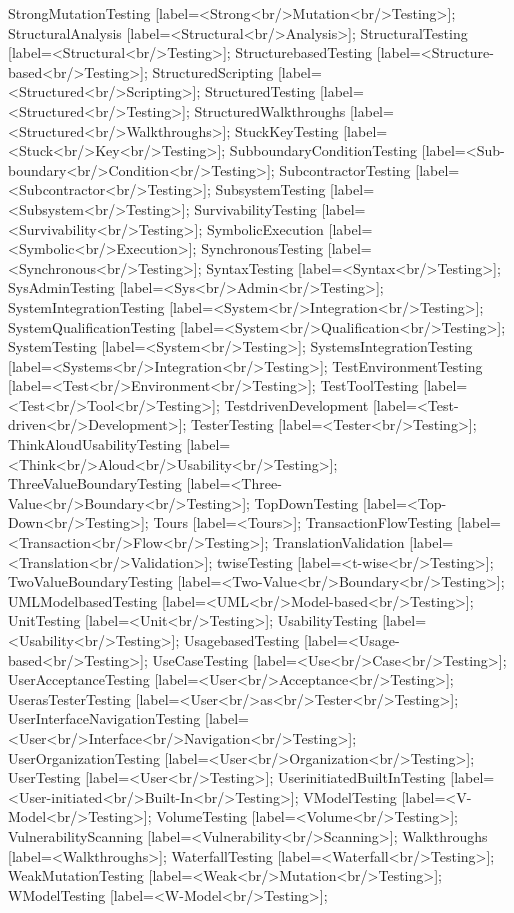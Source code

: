 \documentclass{article}
\begin{document}
{StrongMutationTesting [label=<Strong<br/>Mutation<br/>Testing>];
StructuralAnalysis [label=<Structural<br/>Analysis>];
StructuralTesting [label=<Structural<br/>Testing>];
StructurebasedTesting [label=<Structure-based<br/>Testing>];
StructuredScripting [label=<Structured<br/>Scripting>];
StructuredTesting [label=<Structured<br/>Testing>];
StructuredWalkthroughs [label=<Structured<br/>Walkthroughs>];
StuckKeyTesting [label=<Stuck<br/>Key<br/>Testing>];
SubboundaryConditionTesting [label=<Sub-boundary<br/>Condition<br/>Testing>];
SubcontractorTesting [label=<Subcontractor<br/>Testing>];
SubsystemTesting [label=<Subsystem<br/>Testing>];
SurvivabilityTesting [label=<Survivability<br/>Testing>];
SymbolicExecution [label=<Symbolic<br/>Execution>];
SynchronousTesting [label=<Synchronous<br/>Testing>];
SyntaxTesting [label=<Syntax<br/>Testing>];
SysAdminTesting [label=<Sys<br/>Admin<br/>Testing>];
SystemIntegrationTesting [label=<System<br/>Integration<br/>Testing>];
SystemQualificationTesting [label=<System<br/>Qualification<br/>Testing>];
SystemTesting [label=<System<br/>Testing>];
SystemsIntegrationTesting [label=<Systems<br/>Integration<br/>Testing>];
TestEnvironmentTesting [label=<Test<br/>Environment<br/>Testing>];
TestToolTesting [label=<Test<br/>Tool<br/>Testing>];
TestdrivenDevelopment [label=<Test-driven<br/>Development>];
TesterTesting [label=<Tester<br/>Testing>];
ThinkAloudUsabilityTesting [label=<Think<br/>Aloud<br/>Usability<br/>Testing>];
ThreeValueBoundaryTesting [label=<Three-Value<br/>Boundary<br/>Testing>];
TopDownTesting [label=<Top-Down<br/>Testing>];
Tours [label=<Tours>];
TransactionFlowTesting [label=<Transaction<br/>Flow<br/>Testing>];
TranslationValidation [label=<Translation<br/>Validation>];
twiseTesting [label=<t-wise<br/>Testing>];
TwoValueBoundaryTesting [label=<Two-Value<br/>Boundary<br/>Testing>];
UMLModelbasedTesting [label=<UML<br/>Model-based<br/>Testing>];
UnitTesting [label=<Unit<br/>Testing>];
UsabilityTesting [label=<Usability<br/>Testing>];
UsagebasedTesting [label=<Usage-based<br/>Testing>];
UseCaseTesting [label=<Use<br/>Case<br/>Testing>];
UserAcceptanceTesting [label=<User<br/>Acceptance<br/>Testing>];
UserasTesterTesting [label=<User<br/>as<br/>Tester<br/>Testing>];
UserInterfaceNavigationTesting [label=<User<br/>Interface<br/>Navigation<br/>Testing>];
UserOrganizationTesting [label=<User<br/>Organization<br/>Testing>];
UserTesting [label=<User<br/>Testing>];
UserinitiatedBuiltInTesting [label=<User-initiated<br/>Built-In<br/>Testing>];
VModelTesting [label=<V-Model<br/>Testing>];
VolumeTesting [label=<Volume<br/>Testing>];
VulnerabilityScanning [label=<Vulnerability<br/>Scanning>];
Walkthroughs [label=<Walkthroughs>];
WaterfallTesting [label=<Waterfall<br/>Testing>];
WeakMutationTesting [label=<Weak<br/>Mutation<br/>Testing>];
WModelTesting [label=<W-Model<br/>Testing>];

}
\end{document}
